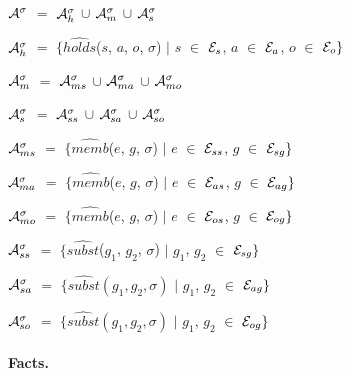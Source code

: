 \documentclass[11pt]{report}
\newenvironment{vquote}
{
  \begin{list}{}{\leftmargin 1em}\item[]
}
{
  \end{list}
}
\begin{document}
            \begin{vquote}
              ${\cal A}^{\sigma}$ $=$
                ${\cal A}^{\sigma}_{h}$ $\cup$
                ${\cal A}^{\sigma}_{m}$ $\cup$
                ${\cal A}^{\sigma}_{s}$
    
              ${\cal A}^{\sigma}_{h}$ $=$
                $\{\hat{holds}$($s$, $a$, $o$, $\sigma$) $\mid$
                  $s$ $\in$ ${\cal E}_{s}$,
                  $a$ $\in$ ${\cal E}_{a}$,
                  $o$ $\in$ ${\cal E}_{o}\}$
    
              ${\cal A}^{\sigma}_{m}$ $=$
               ${\cal A}^{\sigma}_{ms}$ $\cup$
               ${\cal A}^{\sigma}_{ma}$ $\cup$
               ${\cal A}^{\sigma}_{mo}$
    
              ${\cal A}^{\sigma}_{s}$ $=$
                ${\cal A}^{\sigma}_{ss}$ $\cup$
                ${\cal A}^{\sigma}_{sa}$ $\cup$
                ${\cal A}^{\sigma}_{so}$
    
              ${\cal A}^{\sigma}_{ms}$ $=$
                $\{\hat{memb}$($e$, $g$, $\sigma$) $\mid$
                  $e$ $\in$ ${\cal E}_{ss}$,
                  $g$ $\in$ ${\cal E}_{sg}\}$
    
              ${\cal A}^{\sigma}_{ma}$ $=$
                $\{\hat{memb}$($e$, $g$, $\sigma$) $\mid$
                  $e$ $\in$ ${\cal E}_{as}$,
                  $g$ $\in$ ${\cal E}_{ag}\}$
    
              ${\cal A}^{\sigma}_{mo}$ $=$
                $\{\hat{memb}$($e$, $g$, $\sigma$) $\mid$
                  $e$ $\in$ ${\cal E}_{os}$,
                  $g$ $\in$ ${\cal E}_{og}\}$
    
              ${\cal A}^{\sigma}_{ss}$ $=$
                $\{\hat{subst}$($g_{1}$, $g_{2}$, $\sigma$) $\mid$
                  $g_{1}$, $g_{2}$ $\in$ ${\cal E}_{sg}\}$
    
              ${\cal A}^{\sigma}_{sa}$ $=$
                $\{\hat{subst}(g_{1}, g_{2}, \sigma)$ $\mid$
                  $g_{1}$, $g_{2}$ $\in$ ${\cal E}_{ag}\}$
    
              ${\cal A}^{\sigma}_{so}$ $=$
                $\{\hat{subst}(g_{1}, g_{2}, \sigma)$ $\mid$
                  $g_{1}$, $g_{2}$ $\in$ ${\cal E}_{og}\}$
            \end{vquote}

          \paragraph{Facts.}
\end{document}
